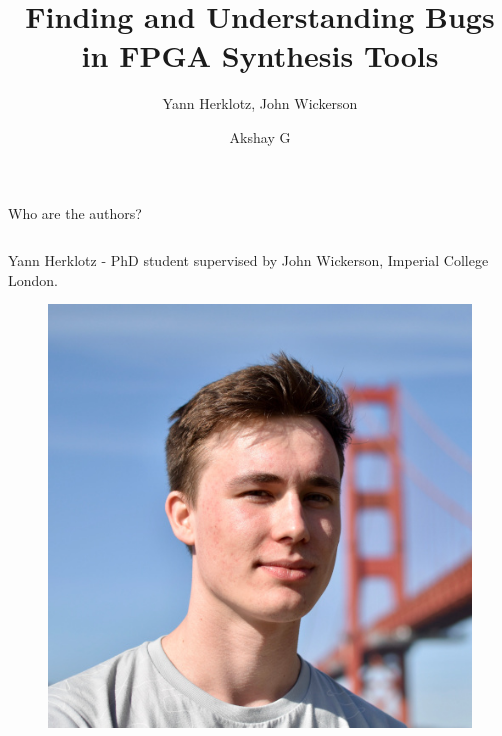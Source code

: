 \documentclass[xcolor=dvipsnames]{beamer}
\title{Finding and Understanding Bugs in FPGA Synthesis Tools}
\subtitle{Yann Herklotz, John Wickerson}
\author{Akshay G}
\begin{document}
    

    \begin{frame}

        \titlepage

    \end{frame}

    \begin{frame}{Who are the authors?}

        \begin{columns}
            
            \begin{column}[]{0.5\textwidth}

                Yann Herklotz - PhD student supervised by John Wickerson, Imperial College London. 
                \begin{figure}
                    \includegraphics[scale=0.2]{YannHerklotz.jpg}
                \end{figure}
                
            \end{column}



\end{columns}
\end{frame}
\end{document}
